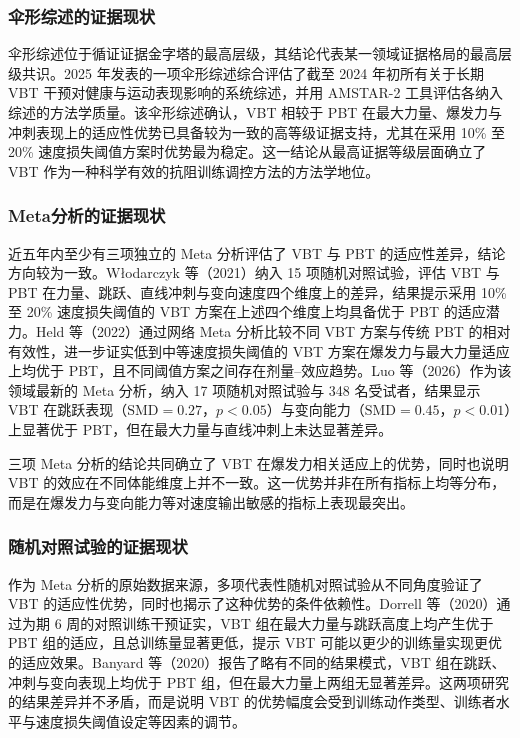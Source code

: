\documentclass[UTF8,zihao=-4,twoside,openany]{ctexbook}
\begin{document}
\subsubsection{伞形综述的证据现状}
伞形综述位于循证证据金字塔的最高层级，其结论代表某一领域证据格局的最高层级共识。2025 年发表的一项伞形综述综合评估了截至 2024 年初所有关于长期 VBT 干预对健康与运动表现影响的系统综述，并用 AMSTAR-2 工具评估各纳入综述的方法学质量。该伞形综述确认，VBT 相较于 PBT 在最大力量、爆发力与冲刺表现上的适应性优势已具备较为一致的高等级证据支持，尤其在采用 10\% 至 20\% 速度损失阈值方案时优势最为稳定。这一结论从最高证据等级层面确立了 VBT 作为一种科学有效的抗阻训练调控方法的方法学地位。

\subsubsection{Meta分析的证据现状}
近五年内至少有三项独立的 Meta 分析评估了 VBT 与 PBT 的适应性差异，结论方向较为一致。W{\l}odarczyk 等（2021）纳入 15 项随机对照试验，评估 VBT 与 PBT 在力量、跳跃、直线冲刺与变向速度四个维度上的差异，结果提示采用 10\% 至 20\% 速度损失阈值的 VBT 方案在上述四个维度上均具备优于 PBT 的适应潜力。Held 等（2022）通过网络 Meta 分析比较不同 VBT 方案与传统 PBT 的相对有效性，进一步证实低到中等速度损失阈值的 VBT 方案在爆发力与最大力量适应上均优于 PBT，且不同阈值方案之间存在剂量--效应趋势。Luo 等（2026）作为该领域最新的 Meta 分析，纳入 17 项随机对照试验与 348 名受试者，结果显示 VBT 在跳跃表现（$\text{SMD}=0.27$，$p<0.05$）与变向能力（$\text{SMD}=0.45$，$p<0.01$）上显著优于 PBT，但在最大力量与直线冲刺上未达显著差异。

三项 Meta 分析的结论共同确立了 VBT 在爆发力相关适应上的优势，同时也说明 VBT 的效应在不同体能维度上并不一致。这一优势并非在所有指标上均等分布，而是在爆发力与变向能力等对速度输出敏感的指标上表现最突出。

\subsubsection{随机对照试验的证据现状}
作为 Meta 分析的原始数据来源，多项代表性随机对照试验从不同角度验证了 VBT 的适应性优势，同时也揭示了这种优势的条件依赖性。Dorrell 等（2020）通过为期 6 周的对照训练干预证实，VBT 组在最大力量与跳跃高度上均产生优于 PBT 组的适应，且总训练量显著更低，提示 VBT 可能以更少的训练量实现更优的适应效果。Banyard 等（2020）报告了略有不同的结果模式，VBT 组在跳跃、冲刺与变向表现上均优于 PBT 组，但在最大力量上两组无显著差异。这两项研究的结果差异并不矛盾，而是说明 VBT 的优势幅度会受到训练动作类型、训练者水平与速度损失阈值设定等因素的调节。
\end{document}
